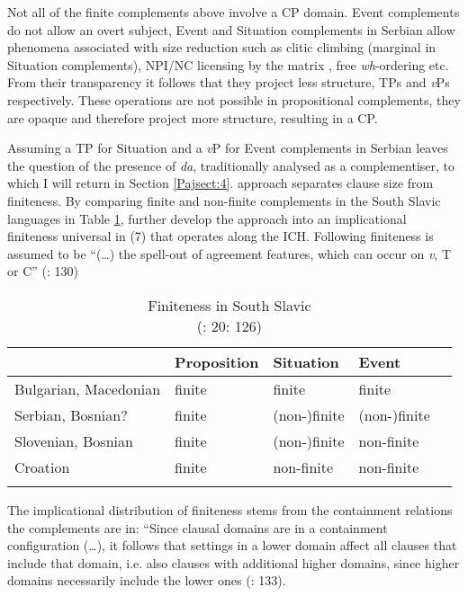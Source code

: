 \documentclass[output=paper]{langscibook}
\begin{document}
Not all of the finite complements above involve a CP domain. Event complements do not allow an overt subject, Event and Situation complements in Serbian allow phenomena associated with size reduction such as clitic climbing (marginal in Situation complements), NPI/NC licensing by the matrix , free \emph{wh}-ordering etc. From their transparency it follows that they project less structure, TPs and \emph{v}Ps respectively. These operations are not possible in propositional complements, they are opaque and therefore project more structure, resulting in a CP. 

Assuming a TP for Situation and a \emph{v}P for Event complements in Serbian leaves the question of the presence of \emph{da}, traditionally analysed as a complementiser, to which I will return in Section \ref{Pajsect:4}.
 \citeyear{todorovickwurmbrand2020} approach separates clause size from finiteness. By comparing finite and non-finite complements in the South Slavic languages in Table \ref{Pajtab4}, \citet{wurmbrandetal2020} further develop the approach into an implicational finiteness universal in (7) that operates along the ICH. Following \citet{adger2007} finiteness is assumed to be “(…) the spell-out of agreement features, which can occur on \emph{v}, T or C” (\citealt{wurmbrandetal2020}: 130)

\begin{table}
\caption{Finiteness in South Slavic\\
(\citealt{wurmbrandetal2020}: 20: 126)}
\label{Pajtab4}
 \begin{tabular}{l llll}
  \lsptoprule
            & Proposition & Situation  & Event \\
  \midrule
  Bulgarian, Macedonian  &  finite &   finite  &   finite    \\
  Serbian, Bosnian? & finite  & (non-)finite  & (non-)finite\\
  Slovenian, Bosnian & finite & (non-)finite  &    non-finite    \\
  Croation &   finite &   non-finite  &    non-finite     \\
  \lspbottomrule
 \end{tabular}
\end{table}


The implicational distribution of finiteness stems from the containment relations the complements are in: “Since clausal domains are in a containment configuration (…), it follows that settings in a lower domain affect all clauses that include that domain, i.e. also clauses
with additional higher domains, since higher domains necessarily include the lower ones (\citealt{wurmbrandetal2020}: 133). 
\end{document}
